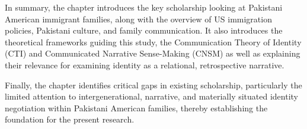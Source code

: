 In summary, the chapter introduces the key scholarship looking at Pakistani American immigrant families, along with the overview of US immigration policies, Pakistani culture, and family communication.  It also introduces the theoretical frameworks guiding this study, the Communication Theory of Identity (CTI) and Communicated Narrative Sense-Making (CNSM) as well as explaining their relevance for examining identity as a relational, retrospective narrative. 

Finally, the chapter identifies critical gaps in existing scholarship, particularly the limited attention to intergenerational, narrative, and materially situated identity negotiation within Pakistani American families, thereby establishing the foundation for the present research.
